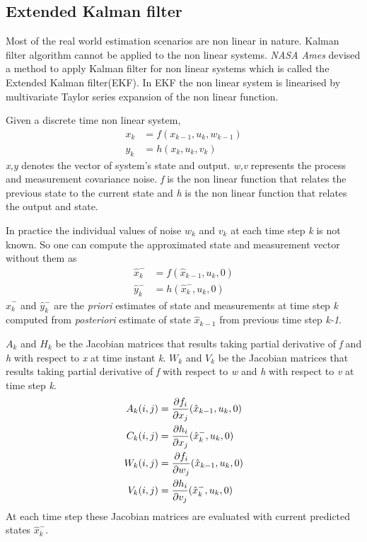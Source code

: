 \subsection{Extended Kalman filter}
Most of the real world estimation scenarios are non linear in nature. Kalman filter algorithm cannot be applied to the non linear systems. \emph{NASA Ames} devised a method to apply Kalman filter for non linear systems which is called the Extended Kalman filter(EKF). In EKF the non linear system is linearised by multivariate Taylor series expansion of the non linear function. 

Given a discrete time non linear system,
\begin{equation}
\begin{split}
x_{k} &= f(x_{k-1},u_k,w_{k-1})\\
y_k &= h(x_k,u_k,v_k)
\end{split}
\end{equation}
\emph{x,y} denotes the vector of system's state and output. \emph{w,v} represents the process and measurement covariance noise. \emph{f} is the non linear function that relates the previous state to the current state and \emph{h} is the non linear function that relates the output and state. 

In practice the individual values of noise $w_k$ and $v_k$ at each time step \emph{k} is not known. So one can compute the approximated state and measurement vector without them as 
\begin{equation}
\begin{split}
\hat{x}_k^- &= f(\hat{x}_{k-1},u_{k},0)\\
\hat{y}_k^- &= h(\hat{x}_k^-,u_{k},0)
\end{split}
\end{equation}
$\hat{x}_k^-$ and $\hat{y}_k^-$ are the \emph{priori} estimates of state and measurements at time step \emph{k} computed from \emph{posteriori} estimate of state $\hat{x}_{k-1}$ from previous time step \emph{k-1}.

$A_k$ and $H_k$ be the Jacobian matrices that results taking partial derivative of \emph{f} and \emph{h} with respect to \emph{x}  at time instant \emph{k}. $W_k$ and $V_k$ be the Jacobian matrices that results taking partial derivative of \emph{f} with respect to \emph{w} and \emph{h} with respect to \emph{v} at time step \emph{k}.
\begin{equation}
\begin{split}
A_k(i,j) &= \frac{\partial {f_i}}{\partial {x_j}}(\hat{x}_{k-1},u_k,0)\\
C_k(i,j) &= \frac{\partial {h_i}}{\partial {x_j}}(\hat{x}_k^-,u_k,0)\\
W_k(i,j) &= \frac{\partial {f_i}}{\partial {w_j}}(\hat{x}_{k-1},u_k,0)\\
V_k(i,j) &= \frac{\partial {h_i}}{\partial {v_j}}(\hat{x}_k^-,u_k,0)\\
\end{split}
\end{equation}
At each time step these Jacobian matrices are evaluated with current predicted states $\hat{x}_k^-$.
